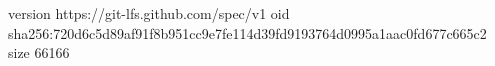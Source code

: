 version https://git-lfs.github.com/spec/v1
oid sha256:720d6c5d89af91f8b951cc9e7fe114d39fd9193764d0995a1aac0fd677c665c2
size 66166

